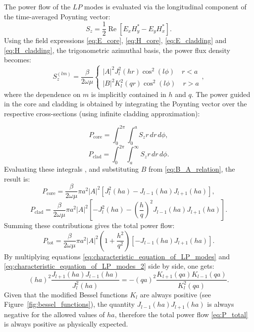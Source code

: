 The power flow of the $LP$ modes is evaluated via the longitudinal component of the time-averaged Poynting vector:
\begin{equation}
    S_z = \frac{1}{2} \operatorname{Re} [E_xH_y^*-E_yH_x^*].
\end{equation}
Using the field expressions \eqref{eq:E_core}, \eqref{eq:H_core}, \eqref{eq:E_cladding} and \eqref{eq:H_cladding}, the trigonometric azimuthal basis, the power flux density becomes:
\begin{equation}
    S_z^{(lm)}=
    \frac{\beta}{2\omega\mu}
    \begin{cases}
        |A|^2 J_l^2(hr) \cos^2(l\phi) \quad r<a \\[2.5mm]
        |B|^2 K_l^2(qr) \cos^2(l\phi) \quad r>a
    \end{cases},
\end{equation}
where the dependence on $m$ is implicitly contained in $h$ and $q$.
The power guided in the core and cladding is obtained by integrating the Poynting vector over the respective cross-sections (using infinite cladding approximation):
\vspace{-5mm}

\begin{equation}
    P_{\text{core}} = \int_{0}^{2\pi} \int_{0}^{a} S_z r \, dr \, d\phi,
\end{equation}
\begin{equation}
        P_{\text{clad}} = \int_{0}^{2\pi} \int_{a}^{\infty} S_z r \, dr \, d\phi.
\end{equation}
Evaluating these integrals \cite{yariv2007photonics}, and substituting $B$ from \eqref{eq:B_A_relation}, the result is:
\begin{equation}
    P_{\text{core}} = \frac{\beta}{2\omega\mu}\pi a^2 |A|^2 \left[ J_l^2(ha) - J_{l-1}(ha)J_{l+1}(ha) \right],
\end{equation}
\begin{equation}
    P_{\text{clad}} = \frac{\beta}{2\omega\mu}\pi a^2 |A|^2 \left[ -J_l^2(ha) - \left(\frac{h}{q}\right)^2 J_{l-1}(ha)J_{l+1}(ha) \right].
\end{equation}
Summing these contributions gives the total power flow:
\begin{equation}
    \label{eq:P_total}
    P_\text{tot} = \frac{\beta}{2\omega\mu}\pi a^2 |A|^2 \left( 1 + \frac{h^2}{q^2} \right) \left[ -J_{l-1}(ha)J_{l+1}(ha) \right].
\end{equation}
By multiplying equations \eqref{eq:characteristic_equation_of_LP_modes} and \eqref{eq:characteristic_equation_of_LP_modes_2} side by side, one gets:
\begin{equation}
    (ha)^2\frac{J_{l+1}(ha)J_{l-1}(ha)}{J_l^2(ha)} = - (qa)^2\frac{K_{l+1}(qa)K_{l-1}(qa)}{K_l^2(qa)}.
\end{equation}
Given that the modified Bessel functions $K_l$ are always positive (see Figure~\ref{fig:bessel_functions}), the quantity $J_{l-1}(ha)J_{l+1}(ha)$ is always negative for the allowed values of $ha$, therefore the total power flow \eqref{eq:P_total} is always positive as physically expected.


